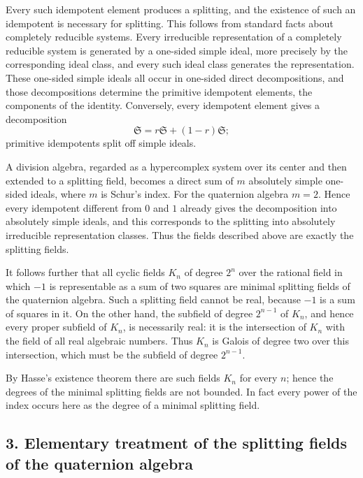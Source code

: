 \documentclass[
  12pt,
]{article}
\begin{document}
Every such idempotent element produces a splitting, and the existence of
such an idempotent is necessary for splitting. This follows from
standard facts about completely reducible systems. Every irreducible
representation of a completely reducible system is generated by a
one-sided simple ideal, more precisely by the corresponding ideal class,
and every such ideal class generates the representation. These one-sided
simple ideals all occur in one-sided direct decompositions, and those
decompositions determine the primitive idempotent elements, the
components of the identity. Conversely, every idempotent element gives a
decomposition \[
  \mathfrak S=r\mathfrak S+(1-r)\mathfrak S;
\] primitive idempotents split off simple ideals.

A division algebra, regarded as a hypercomplex system over its center
and then extended to a splitting field, becomes a direct sum of \(m\)
absolutely simple one-sided ideals, where \(m\) is Schur's index. For
the quaternion algebra \(m=2\). Hence every idempotent different from
\(0\) and \(1\) already gives the decomposition into absolutely simple
ideals, and this corresponds to the splitting into absolutely
irreducible representation classes. Thus the fields described above are
exactly the splitting fields.

It follows further that all cyclic fields \(K_n\) of degree \(2^n\) over
the rational field in which \(-1\) is representable as a sum of two
squares are minimal splitting fields of the quaternion algebra. Such a
splitting field cannot be real, because \(-1\) is a sum of squares in
it. On the other hand, the subfield of degree \(2^{n-1}\) of \(K_n\),
and hence every proper subfield of \(K_n\), is necessarily real: it is
the intersection of \(K_n\) with the field of all real algebraic
numbers. Thus \(K_n\) is Galois of degree two over this intersection,
which must be the subfield of degree \(2^{n-1}\).

By Hasse's existence theorem there are such fields \(K_n\) for every
\(n\); hence the degrees of the minimal splitting fields are not
bounded. In fact every power of the index occurs here as the degree of a
minimal splitting field.

\subsection{3. Elementary treatment of the splitting fields of the
quaternion
algebra}\label{elementary-treatment-of-the-splitting-fields-of-the-quaternion-algebra}
\end{document}
